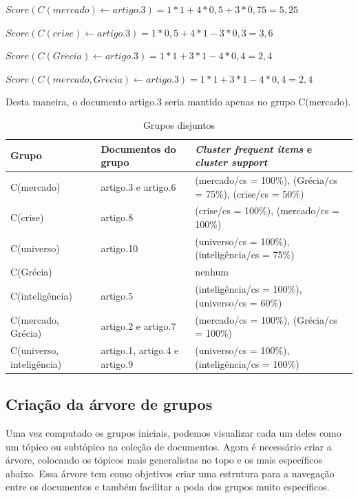 \documentclass[a4paper,12pt]{article}
\begin{document}
\begin{flushleft}

$Score(C(mercado) \gets artigo.3) = 1 * 1 + 4 * 0,5 + 3 * 0,75 = 5,25$

$Score(C(crise) \gets artigo.3) = 1 * 0,5 + 4 * 1 - 3 * 0,3 = 3,6$

$Score(C(Gr\acute{e}cia) \gets artigo.3) = 1 * 1 + 3 * 1 - 4 * 0,4 = 2,4$

$Score(C(mercado, Gr\acute{e}cia) \gets artigo.3) = 1 * 1 + 3 * 1 - 4 * 0,4 = 2,4$

\end{flushleft}

Desta maneira, o documento artigo.3 seria mantido apenas no grupo C(mercado).

\begin{table}[h]
\centering
\begin{tabular}{ | l | p{4cm} | p{4.5cm} | }
\hline
Grupo & Documentos do grupo & \textit{Cluster frequent items} e \textit{cluster support} \\ \hline
C(mercado)			& artigo.3 e artigo.6 & (mercado/cs = 100\%), (Grécia/cs = 75\%), (crise/cs = 50\%) \\ \hline
C(crise)                         	& artigo.8 & (crise/cs = 100\%), (mercado/cs = 100\%)  \\ \hline
C(universo)			& artigo.10 & (universo/cs = 100\%), (inteligência/cs = 75\%)  \\ \hline
C(Grécia)			& & nenhum  \\ \hline
C(inteligência)		& artigo.5 & (inteligência/cs = 100\%), (universo/cs = 60\%)  \\ \hline
C(mercado, Grécia)		& artigo.2 e artigo.7 & (mercado/cs = 100\%), (Grécia/cs = 100\%)  \\ \hline
C(universo, inteligência)	& artigo.1, artigo.4 e artigo.9 & (universo/cs = 100\%), (inteligência/cs = 100\%)  \\
\hline
\end{tabular}
\caption{Grupos disjuntos}
\label{table:grupos_disjuntos}
\end{table}

\subsection {Criação da árvore de grupos}
\label {sec:criacao_arvore_grupos}

Uma vez computado os grupos iniciais, podemos visualizar cada um deles como um tópico ou subtópico na coleção de documentos. Agora é necessário criar a árvore, colocando os tópicos mais generalistas no topo e os mais específicos abaixo. Essa árvore tem como objetivos criar uma estrutura para a navegação entre os documentos e também facilitar a poda dos grupos muito específicos.
\end{document}
